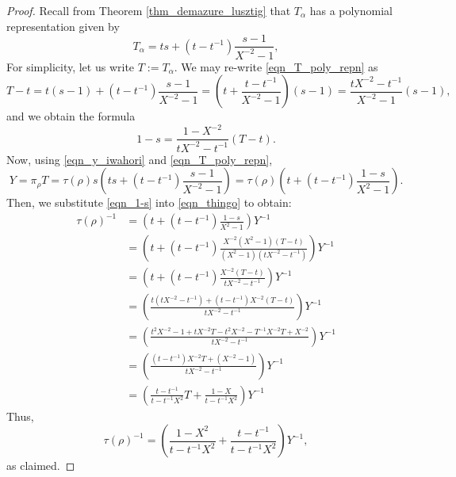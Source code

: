 \documentclass[a4paper]{report}
\theoremstyle{theorem}
\theoremstyle{definition}
\theoremstyle{remark}
\theoremstyle{proposition}
\theoremstyle{conjecture}
\theoremstyle{lemma}
\theoremstyle{corollary}
\theoremstyle{exercise}
\theoremstyle{example}
\begin{document}
  \begin{proof}
      Recall from Theorem \ref{thm_demazure_lusztig} that $T_\alpha$ has a polynomial representation
      given by 
      \begin{equation}\label{eqn_T_poly_repn}
          T_\alpha = ts + (t-t^{-1})\frac{s-1}{X^{-2} - 1},
      \end{equation}
      For simplicity, let us write $T := T_\alpha$.
      We may re-write \eqref{eqn_T_poly_repn} as 
      $$T - t = t(s-1) + (t-t^{-1})\frac{s-1}{X^{-2}-1} = \left(t + \frac{t-t^{-1}}{X^{-2}-1}\right)(s-1) = \frac{tX^{-2} - t^{-1}}{X^{-2}-1}(s-1),$$
      and we obtain the formula 
      \begin{equation}\label{eqn_1-s}
          1-s = \frac{1 - X^{-2}}{tX^{-2}-t^{-1}} (T-t).
      \end{equation} 
      Now, using \eqref{eqn_y_iwahori} and \eqref{eqn_T_poly_repn}, 
      \begin{equation}\label{eqn_thingo}
          Y = \pi_\rho T = \tau(\rho)s \left(ts + (t-t^{-1})\frac{s-1}{X^{-2}-1}\right) = \tau(\rho) \left(t + (t-t^{-1})\frac{1-s}{X^2-1}\right).
      \end{equation}
      Then, we substitute \eqref{eqn_1-s} into \eqref{eqn_thingo} to obtain:
      \begin{align*}
          \tau(\rho)^{-1} &= \left(t + (t-t^{-1}) \frac{1-s}{X^2-1}\right)Y^{-1}\\
                          &= \left(t + (t-t^{-1}) \frac{X^{-2}(X^2-1)(T-t)}{(X^2-1)(tX^{-2}-t^{-1})}\right)Y^{-1}\\
                          &= \left(t + (t-t^{-1}) \frac{X^{-2}(T-t)}{tX^{-2}-t^{-1}}\right)Y^{-1}\\
                          &= \left( \frac{t(tX^{-2}-t^{-1}) + (t-t^{-1})X^{-2}(T-t)}{tX^{-2}-t^{-1}}\right)Y^{-1}\\
                          &=\left(\frac{t^2X^{-2} - 1 + tX^{-2}T -t^2X^{-2} - T^{-1}X^{-2}T + X^{-2}}{tX^{-2}-t^{-1}}\right)Y^{-1}\\
                          &= \left(\frac{(t-t^{-1})X^{-2}T + (X^{-2}-1)}{tX^{-2}-t^{-1}}\right)Y^{-1}\\
                          &= \left(\frac{t-t^{-1}}{t-t^{-1}X^2}T + \frac{1-X}{t-t^{-1}X^2}\right)Y^{-1}
  \end{align*}
      Thus,
      \begin{equation}\label{eqn_taurho}
          \tau(\rho)^{-1} = \left(\frac{1-X^2}{t-t^{-1}X^2} + \frac{t-t^{-1}}{t-t^{-1}X^2}\right)Y^{-1},
      \end{equation}
      as claimed.
  \end{proof}
  
\end{document}
